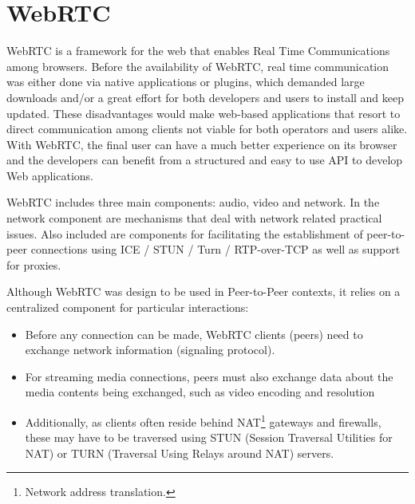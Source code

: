 \section{WebRTC}
\label{sec:webrtc}
WebRTC\cite{webrtc} is a framework for the web that enables Real Time Communications among browsers. Before the availability of WebRTC, real time communication was either done via native applications or plugins, which demanded large downloads and/or a great effort for both developers and users to install and keep updated. These disadvantages would make web-based applications that resort to direct communication among clients not viable for both operators and users alike. With WebRTC, the final user can have a much better experience on its browser and the developers can benefit from a structured and easy to use API to develop Web applications.\par
	WebRTC includes three main components: audio, video and network. In the network component are mechanisms that deal with network related practical issues. Also included are components for facilitating the establishment of peer-to-peer connections using ICE / STUN / Turn / RTP-over-TCP as well as support for proxies.\par
	Although WebRTC was design to be used in Peer-to-Peer contexts, it relies on a centralized component for particular interactions:
	\begin{itemize}
	\item Before any connection can be made, WebRTC clients (peers) need to exchange network information (signaling protocol).
	
	\item For streaming media connections, peers must also exchange data about the media contents being exchanged, such as video encoding and resolution
	
	\item Additionally, as clients often reside behind NAT\footnote{Network address translation.} gateways and firewalls, these may have to be traversed using STUN (Session Traversal Utilities for NAT) or TURN (Traversal Using Relays around NAT) servers.
	\end{itemize}
	
